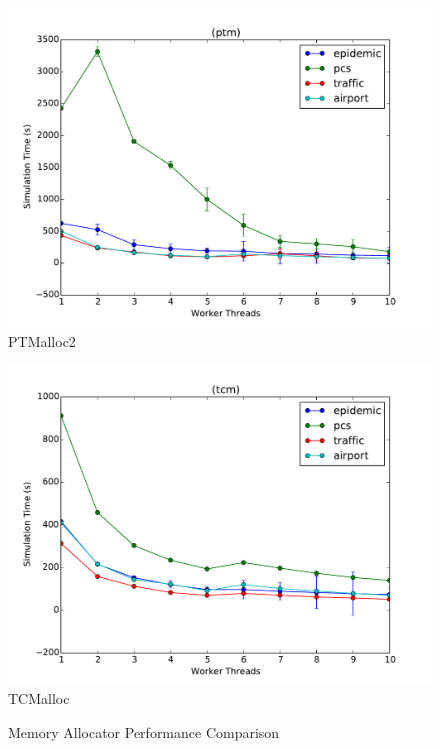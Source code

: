 \documentclass[11pt]{book}
\begin{document}
\begin{figure}
  \begin{minipage}{.5\textwidth}
    \begin{center}
      \includegraphics[width=\textwidth,keepaspectratio,quiet]{figs/memory_allocation/ptm_times.pdf} \\
      PTMalloc2 \\
    \end{center}
  \end{minipage}%
  \hfill
  \begin{minipage}{.5\textwidth}
    \begin{center}
      \includegraphics[width=\textwidth,keepaspectratio,quiet]{figs/memory_allocation/tcm_times.pdf} \\
      TCMalloc \\
    \end{center}
  \end{minipage}
  \caption{Memory Allocator Performance Comparison}\label{allocator_analysis}
\end{figure}
\end{document}
